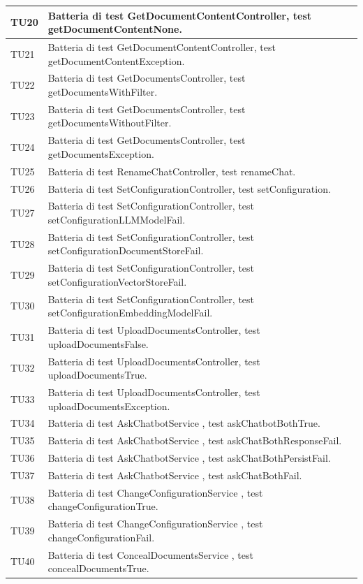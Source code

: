 \documentclass[10pt, a4paper]{article}
\begin{document}
\begin{xltabular}{\textwidth}{p{0.12\textwidth}|X}
\hline
TU20 & Batteria di test GetDocumentContentController, test getDocumentContentNone. \\
\hline
TU21 & Batteria di test GetDocumentContentController, test getDocumentContentException. \\
\hline
TU22 & Batteria di test GetDocumentsController, test getDocumentsWithFilter. \\
\hline
TU23 & Batteria di test GetDocumentsController, test getDocumentsWithoutFilter. \\
\hline
TU24 & Batteria di test GetDocumentsController, test getDocumentsException. \\
\hline
TU25 & Batteria di test RenameChatController, test renameChat. \\
\hline
TU26 & Batteria di test SetConfigurationController, test setConfiguration. \\
\hline
TU27 & Batteria di test SetConfigurationController, test setConfigurationLLMModelFail. \\
\hline
TU28 & Batteria di test SetConfigurationController, test setConfigurationDocumentStoreFail. \\
\hline
TU29 & Batteria di test SetConfigurationController, test setConfigurationVectorStoreFail. \\
\hline
TU30 & Batteria di test SetConfigurationController, test setConfigurationEmbeddingModelFail. \\
\hline
TU31 & Batteria di test UploadDocumentsController, test uploadDocumentsFalse. \\
\hline
TU32 & Batteria di test UploadDocumentsController, test uploadDocumentsTrue. \\
\hline
TU33 & Batteria di test UploadDocumentsController, test uploadDocumentsException. \\
\hline
TU34 & Batteria di test AskChatbotService , test askChatbotBothTrue. \\
\hline
TU35 & Batteria di test AskChatbotService , test askChatBothResponseFail. \\
\hline
TU36 & Batteria di test AskChatbotService , test askChatBothPersistFail. \\
\hline
TU37 & Batteria di test AskChatbotService , test askChatBothFail. \\
\hline
TU38 & Batteria di test ChangeConfigurationService , test changeConfigurationTrue. \\
\hline
TU39 & Batteria di test ChangeConfigurationService , test changeConfigurationFail. \\
\hline
TU40 & Batteria di test ConcealDocumentsService , test concealDocumentsTrue. \\

\end{xltabular}
\end{document}

